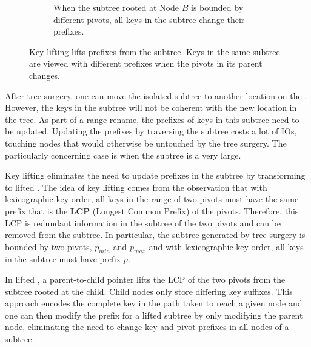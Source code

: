 \begin{figure}
\begin{subfigure}{\textwidth}
        \caption{\label{subfig:lift-2} When the subtree rooted at Node $B$ is bounded by different pivots, all keys in the subtree change their prefixes.}
    \end{subfigure}
    \caption[Key lifting example]{\label{fig:lift}
        Key lifting lifts prefixes from the subtree. Keys in the same subtree
        are viewed with different prefixes when the pivots in its parent
        changes.}
\end{figure}

After tree surgery, one can move the isolated subtree to another location on
the \bet.
However, the keys in the subtree will not be coherent with the new location in
the tree.
As part of a range-rename, the prefixes of keys in this subtree need to be
updated.
Updating the prefixes by traversing the subtree costs a lot of IOs, touching
nodes that would otherwise be untouched by the tree surgery.
The particularly concerning case is when the subtree is a very large.

Key lifting eliminates the need to update prefixes in the subtree by
transforming \bets to lifted \bets.
The idea of key lifting comes from the observation that with lexicographic key
order, all keys in the range of two pivots must have the same prefix that is
the \textbf{LCP} (Longest Common Prefix) of the pivots.
Therefore, this LCP is redundant information in the subtree of the two pivots
and can be removed from the subtree.
In particular, the subtree generated by tree surgery is bounded by two pivots,
$p_{min}$ and $p_{max}$ and with lexicographic key order, all keys in the
subtree must have prefix $p$.

In lifted \bets, a parent-to-child pointer lifts the LCP of the two pivots from
the subtree rooted at the child.
Child nodes only store differing key suffixes.
This approach encodes the complete key in the path taken to reach a given node
and one can then modify the prefix for a lifted subtree by only modifying the
parent node, eliminating the need to change key and pivot prefixes in all nodes
of a subtree.

